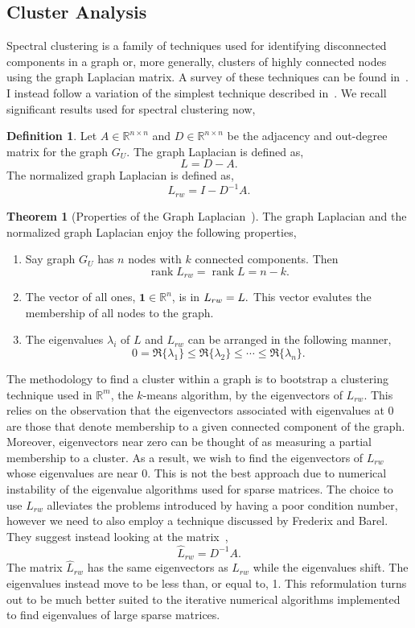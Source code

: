 \documentclass[letterpaper, 10 pt, conference]{ieeeconf}
\theoremstyle{definition}
\newtheorem{definition}{Definition}[section]
\newtheorem{theorem}{Theorem}[section]
\let\ker\relax
\DeclareMathOperator{\rank}{rank}
\DeclareMathOperator{\ker}{ker}
\newcommand{\R}{\mathbb{R}}
\begin{document}
\subsection{Cluster Analysis}
Spectral clustering is a family of techniques used for identifying disconnected components in a graph or, more generally, clusters of highly connected nodes using the graph Laplacian matrix. A survey of these techniques can be found in~\cite{Article:Survey}. I instead follow a variation of the simplest technique described in~\cite{Notes:Laplacian, Article:LaplacianTutorial}. We recall significant results used for spectral clustering now,
\begin{definition}
  Let \(A\in\R^{n \times n}\) and \(D\in\R^{n\times n}\) be the adjacency and out-degree matrix for the graph \(G_U.\) The graph Laplacian is defined as,
  \[
    L = D - A.
  \]
  The normalized graph Laplacian is defined as,
  \[
    L_{rw} = I - D^{-1}A.
  \]
\end{definition}
\begin{theorem}[Properties of the Graph Laplacian~\cite{Notes:Network}]
  The graph Laplacian and the normalized graph Laplacian enjoy the following properties,
  \begin{enumerate}[label=(\alph*)]
    \item{
      Say graph \(G_U\) has \(n\) nodes with \(k\) connected components. Then \[\rank L_{rw} = \rank L = n - k.\]
    }
    \item{
      The vector of all ones, \(\mathbf{1} \in \R^n\), is in \(\ker L_{rw} = \ker L.\) This vector evalutes the membership of all nodes to the graph.
    }
    \item{
      The eigenvalues \(\lambda_i\) of \(L\) and \(L_{rw}\) can be arranged in the following manner,
      \[
        0 = \Re\{\lambda_1\} \leq \Re\{\lambda_2\} \leq \cdots \leq \Re\{\lambda_n\}.
      \]
    }
  \end{enumerate}
\end{theorem}
The methodology to find a cluster within a graph is to bootstrap a clustering technique used in \(\R^m\), the \(k\)-means algorithm, by the eigenvectors of \(L_{rw}.\) This relies on the observation that the eigenvectors associated with eigenvalues at 0 are those that denote membership to a given connected component of the graph. Moreover, eigenvectors near zero can be thought of as measuring a partial membership to a cluster. As a result, we wish to find the eigenvectors of \(L_{rw}\) whose eigenvalues are near 0. This is not the best approach due to numerical instability of the eigenvalue algorithms used for sparse matrices. The choice to use \(L_{rw}\) alleviates the problems introduced by having a poor condition number, however we need to also employ a technique discussed by Frederix and Barel. They suggest instead looking at the matrix~\cite{Article:CholeskyLaplacian},
\[
  \hat{L}_{rw} = D^{-1}A.
\]
The matrix \(\hat{L}_{rw}\) has the same eigenvectors as \(L_{rw}\) while the eigenvalues shift. The eigenvalues instead move to be less than, or equal to, 1. This reformulation turns out to be much better suited to the iterative numerical algorithms implemented to find eigenvalues of large sparse matrices.
\end{document}
